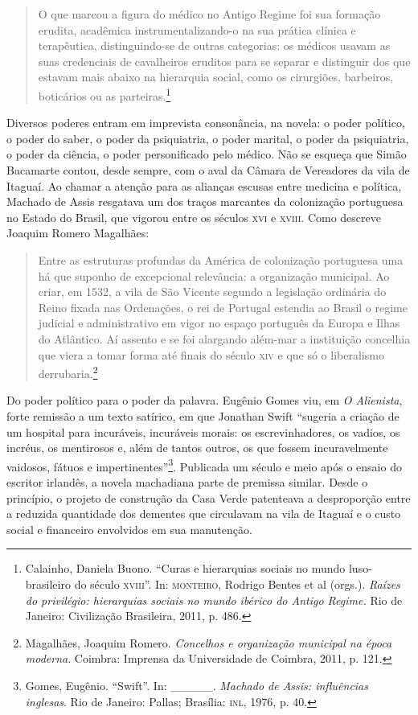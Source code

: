 \begin{quote}
O que marcou a figura do médico no Antigo Regime foi sua formação
erudita, acadêmica instrumentalizando-o na sua prática clínica e
terapêutica, distinguindo-se de outras categorias: os médicos usavam as
suas credenciais de cavalheiros eruditos para se separar e distinguir
dos que estavam mais abaixo na hierarquia social, como os cirurgiões,
barbeiros, boticários ou as parteiras.\footnote{Calainho, Daniela Buono.
  ``Curas e hierarquias sociais no mundo luso-brasileiro do século
  \textsc{xviii}''. In: \textsc{monteiro}, Rodrigo Bentes et al (orgs.). \emph{Raízes do
  privilégio: hierarquias sociais no mundo ibérico do Antigo Regime.}
  Rio de Janeiro: Civilização Brasileira, 2011, p. 486.}
\end{quote}

Diversos poderes entram em imprevista consonância, na novela: o poder
político, o poder do saber, o poder da psiquiatria, o poder marital, o
poder da psiquiatria, o poder da ciência, o poder personificado pelo
médico. Não se esqueça que Simão Bacamarte contou, desde sempre, com o
aval da Câmara de Vereadores da vila de Itaguaí. Ao chamar a atenção
para as alianças escusas entre medicina e política, Machado de Assis
resgatava um dos traços marcantes da colonização portuguesa no Estado do
Brasil, que vigorou entre os séculos \textsc{xvi} e \textsc{xviii}. Como descreve Joaquim
Romero Magalhães:

\begin{quote}
Entre as estruturas profundas da América de colonização portuguesa uma
há que suponho de excepcional relevância: a organização municipal. Ao
criar, em 1532, a vila de São Vicente segundo a legislação ordinária do
Reino fixada nas Ordenações, o rei de Portugal estendia ao Brasil o
regime judicial e administrativo em vigor no espaço português da Europa
e Ilhas do Atlântico. Aí assento e se foi alargando além-mar a
instituição concelhia que viera a tomar forma até finais do século \textsc{xiv} e
que só o liberalismo derrubaria.\footnote{Magalhães, Joaquim Romero.
  \emph{Concelhos e organização municipal na época moderna}. Coimbra:
  Imprensa da Universidade de Coimbra, 2011, p. 121.}
\end{quote}

Do poder político para o poder da palavra. Eugênio Gomes viu, em \emph{O
Alienista}, forte remissão a um texto satírico, em que Jonathan Swift
``sugeria a criação de um hospital para incuráveis, incuráveis morais:
os escrevinhadores, os vadios, os incréus, os mentirosos e, além de
tantos outros, os que fossem incuravelmente vaidosos, fátuos e
impertinentes''\footnote{Gomes, Eugênio. ``Swift''. In: \_\_\_\_\_.
  \emph{Machado de Assis: influências inglesas}. Rio de Janeiro: Pallas;
  Brasília: \textsc{inl}, 1976, p. 40.}. Publicada um século e meio após o ensaio
do escritor irlandês, a novela machadiana parte de premissa similar.
Desde o princípio, o projeto de construção da Casa Verde patenteava a
desproporção entre a reduzida quantidade dos dementes que circulavam na
vila de Itaguaí e o custo social e financeiro envolvidos em sua
manutenção.

